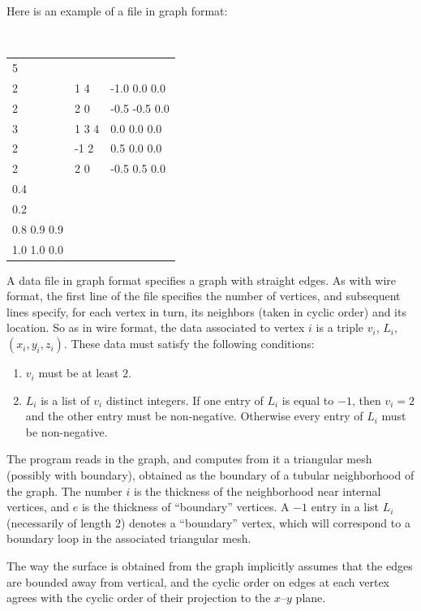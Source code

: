 \documentclass[12pt]{article}
\begin{document}
Here is an example of a file in graph format:

\begin{center}
{\tt
\begin{tabular}{lll}
5 & & \\
2 & 1 4 & -1.0 0.0 0.0 \\
2 & 2 0 & -0.5 -0.5 0.0 \\
3 & 1 3 4 & 0.0 0.0 0.0 \\
2 & -1 2 & 0.5 0.0 0.0 \\
2 & 2 0 & -0.5 0.5 0.0 \\
0.4 & & \\
0.2 & & \\
0.8 0.9 0.9 & & \\
1.0 1.0 0.0 & &
\end{tabular}
}
\end{center}

A data file in graph format specifies a graph with straight edges. As with wire format,
the first line of the file specifies the number of vertices, and subsequent lines specify,
for each vertex in turn, its neighbors (taken in cyclic order) and its location. 
So as in wire format, the data associated to vertex $i$ is a triple $v_i$, $L_i$, $(x_i,y_i,z_i)$.
These data must satisfy the following conditions:
\begin{enumerate}
\item{$v_i$ must be at least $2$.}
\item{$L_i$ is a list of $v_i$ distinct integers. If one entry of $L_i$ is equal to $-1$, then
$v_i=2$ and the other entry must be non-negative. Otherwise every entry of $L_i$ must be
non-negative.}
\end{enumerate}

The program reads in the graph, and computes from it a triangular mesh (possibly with
boundary), obtained as the boundary of a tubular neighborhood of the graph. The
number $i$ is the thickness of the neighborhood near internal vertices, and $e$ is
the thickness of ``boundary'' vertices. A $-1$
entry in a list $L_i$ (necessarily of length 2) denotes a ``boundary'' vertex, which
will correspond to a boundary loop in the associated triangular mesh.

\medskip

The way the surface is obtained from the graph implicitly assumes that the edges are
bounded away from vertical, and the cyclic order on edges at each vertex
agrees with the cyclic order of their projection to the $x$--$y$ plane.
\end{document}
